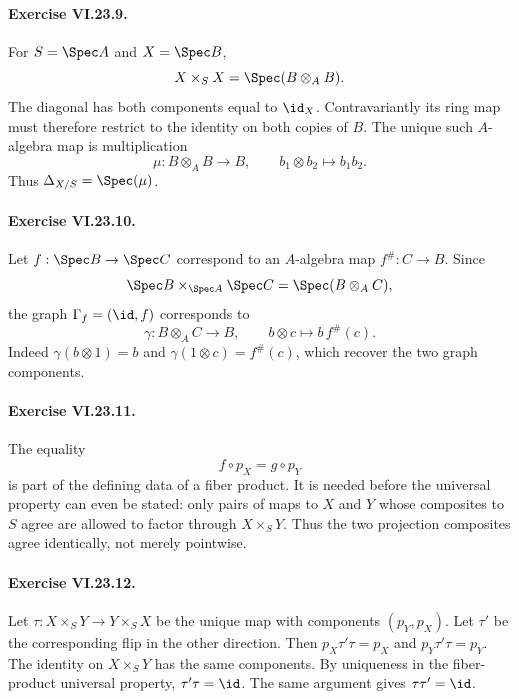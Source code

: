 \paragraph{Exercise VI.23.9.}
\begin{solution}
For $S=\Spec A$ and $X=\Spec B$,
\[
X\times_SX=\Spec(B\otimes_AB).
\]
The diagonal has both components equal to $\id_X$.  Contravariantly its ring map must therefore
restrict to the identity on both copies of $B$.  The unique such $A$-algebra map is multiplication
\[
\mu:B\otimes_AB\longrightarrow B,\qquad b_1\otimes b_2\longmapsto b_1b_2.
\]
Thus $\Delta_{X/S}=\Spec(\mu)$.
\end{solution}

\paragraph{Exercise VI.23.10.}
\begin{solution}
Let $f:\Spec B\to\Spec C$ correspond to an $A$-algebra map
$f^\#:C\to B$.  Since
\[
\Spec B\times_{\Spec A}\Spec C=\Spec(B\otimes_AC),
\]
the graph $\Gamma_f=(\id,f)$ corresponds to
\[
\gamma:B\otimes_AC\longrightarrow B,\qquad
b\otimes c\longmapsto b\,f^\#(c).
\]
Indeed $\gamma(b\otimes1)=b$ and $\gamma(1\otimes c)=f^\#(c)$, which recover the two graph
components.
\end{solution}

\paragraph{Exercise VI.23.11.}
\begin{solution}
The equality
\[
f\circ p_X=g\circ p_Y
\]
is part of the defining data of a fiber product.  It is needed before the universal property can
even be stated: only pairs of maps to $X$ and $Y$ whose composites to $S$ agree are allowed to
factor through $X\times_SY$.  Thus the two projection composites agree identically, not merely
pointwise.
\end{solution}

\paragraph{Exercise VI.23.12.}
\begin{solution}
Let $\tau:X\times_SY\to Y\times_SX$ be the unique map with components $(p_Y,p_X)$.
Let $\tau'$ be the corresponding flip in the other direction.  Then
$p_X\tau'\tau=p_X$ and $p_Y\tau'\tau=p_Y$.  The identity on $X\times_SY$ has the same
components.  By uniqueness in the fiber-product universal property,
$\tau'\tau=\id$.  The same argument gives $\tau\tau'=\id$.
\end{solution}

